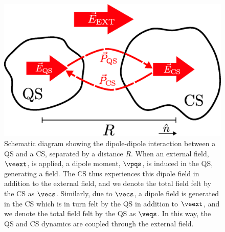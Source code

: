 \begin{figure}[ht]
    \centering
    \includegraphics[width=0.6\columnwidth]{img/qs-cs.eps}
    \caption{Schematic diagram showing the dipole-dipole interaction between a
        QS and a CS, separated by a distance $R$.  When an external field,
        $\veext$, is applied, a dipole moment, $\vpqs$, is induced in the QS,
        generating a field. The CS thus experiences this dipole field in
        addition to the external field, and we denote the total field felt by
        the CS as $\vecs$. Similarly, due to $\vecs$, a dipole field is
        generated in the CS which is in turn felt by the QS in addition to
        $\veext$, and we denote the total field felt by the QS as $\veqs$. In
    this way, the QS and CS dynamics are coupled through the external field.}
    \label{fig:qs-cs}
\end{figure}

